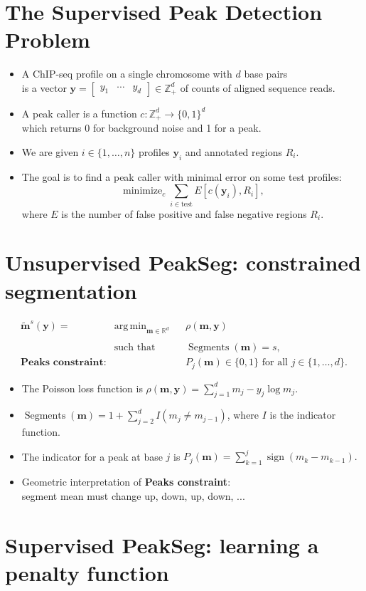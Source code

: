 \documentclass{article}
\newcommand{\ZZ}{\mathbb Z}
\newcommand{\RR}{\mathbb R}
\DeclareMathOperator*{\minimize}{minimize}
\DeclareMathOperator*{\sign}{sign}
\DeclareMathOperator*{\argmin}{arg\,min}
\DeclareMathOperator*{\Segments}{Segments}
\begin{document}
\section*{The Supervised Peak Detection Problem}

\begin{itemize}
\item A ChIP-seq profile on a single
chromosome with $d$ base pairs\\ is a vector $\mathbf y=
\left[
  \begin{array}{ccc}
    y_1 & \cdots & y_d
  \end{array}
\right]\in\ZZ_+^d$ of counts of aligned sequence reads. 
\item A peak caller is a function $c:\ZZ_+^d
  \rightarrow \{0, 1\}^d$\\
  which returns 0 for background noise and 1 for a peak.
\item We are given $i\in\{1,\dots, n\}$ profiles 
  $\mathbf y_i$ and annotated regions $R_i$.
\item The goal is to find a peak caller with minimal error on some
test profiles:
\begin{equation*}
  \label{eq:min_error}
  \minimize_c \sum_{i\in\text{test}} E[c(\mathbf y_i),  R_i],
\end{equation*}
where $E$ is the number of false positive and false negative regions $R_i$.
\end{itemize}

\newpage 

\section*{Unsupervised PeakSeg: 
constrained segmentation}

\begin{equation*}
  \label{argmin:constrained}
  \begin{aligned}
    \mathbf{\tilde m}^s(\mathbf y)  =\ 
    &\argmin_{\mathbf m\in\RR^{d}} && 
    \rho
    (\mathbf m, \mathbf y) \\
    \\
    &\text{such that} && \Segments(\mathbf m)=s,\\
    \textbf{Peaks constraint:}
    & && P_j(\mathbf m) \in\{0, 1\} \text{ for all } j\in\{1, \dots, d\}.
  \end{aligned}
\end{equation*}
\begin{itemize}
\item The Poisson loss function is $\rho(\mathbf m, \mathbf y)=
  \sum_{j=1}^d m_j - y_j \log m_j$.
\item$\Segments(\mathbf m)=1+\sum_{j=2}^d I(m_j \neq m_{j-1})$, where
  $I$ is the indicator function.
\item The indicator for a peak at base $j$ is 
$
  P_j(\mathbf m) = \sum_{k=1}^j \sign( m_k - m_{k-1} ).
$
\item Geometric interpretation of \textbf{Peaks constraint}:\\
  segment mean must change up, down, up, down, ...
\end{itemize}

\newpage

\section*{Supervised PeakSeg: learning a penalty function}


\end{document}
